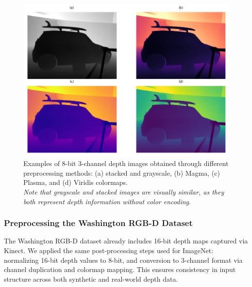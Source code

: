\begin{figure}[h]
    \centering
    \includegraphics[width=1\linewidth]{./images/stacked-plasma-virdis-and-magma.png}
    \caption{Examples of 8-bit 3-channel depth images obtained through different preprocessing methods: (a) stacked and grayscale, (b) Magma, (c) Plasma, and (d) Viridis colormaps. \\ \textit{Note that grayscale and stacked images are visually similar, as they both represent depth information without color encoding.}}
    \label{fig:depth-color-mapping-examples}
\end{figure}

\subsubsection{Preprocessing the Washington RGB-D Dataset}
The Washington RGB-D dataset already includes 16-bit depth maps captured via Kinect. We applied the same post-processing steps used for ImageNet: normalizing 16-bit depth values to 8-bit, and conversion to 3-channel format via channel duplication and colormap mapping. This ensures consistency in input structure across both synthetic and real-world depth data.

